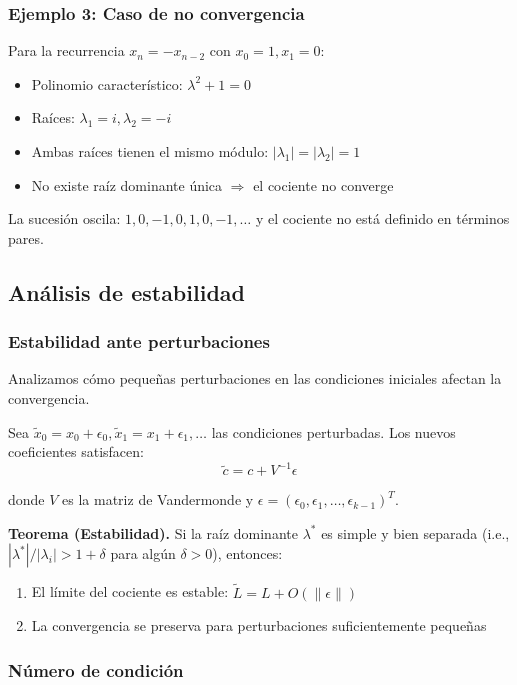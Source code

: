 \documentclass[12pt]{article}
\begin{document}
\subsubsection{Ejemplo 3: Caso de no convergencia}

Para la recurrencia $x_n = -x_{n-2}$ con $x_0 = 1, x_1 = 0$:
\begin{itemize}
    \item Polinomio característico: $\lambda^2 + 1 = 0$
    \item Raíces: $\lambda_1 = i, \lambda_2 = -i$
    \item Ambas raíces tienen el mismo módulo: $|\lambda_1| = |\lambda_2| = 1$
    \item No existe raíz dominante única $\Rightarrow$ el cociente no converge
\end{itemize}

La sucesión oscila: $1, 0, -1, 0, 1, 0, -1, \ldots$ y el cociente no está definido en términos pares.

\subsection{Análisis de estabilidad}

\subsubsection{Estabilidad ante perturbaciones}

Analizamos cómo pequeñas perturbaciones en las condiciones iniciales afectan la convergencia.

Sea $\tilde{x}_0 = x_0 + \epsilon_0, \tilde{x}_1 = x_1 + \epsilon_1, \ldots$ las condiciones perturbadas. Los nuevos coeficientes satisfacen:
\[
\tilde{c} = c + V^{-1}\epsilon
\]

donde $V$ es la matriz de Vandermonde y $\epsilon = (\epsilon_0, \epsilon_1, \ldots, \epsilon_{k-1})^T$.

\textbf{Teorema (Estabilidad).} Si la raíz dominante $\lambda^*$ es simple y bien separada (i.e., $|\lambda^*|/|\lambda_i| > 1 + \delta$ para algún $\delta > 0$), entonces:
\begin{enumerate}
    \item El límite del cociente es estable: $\tilde{L} = L + O(\|\epsilon\|)$
    \item La convergencia se preserva para perturbaciones suficientemente pequeñas
\end{enumerate}

\subsubsection{Número de condición}
\end{document}
